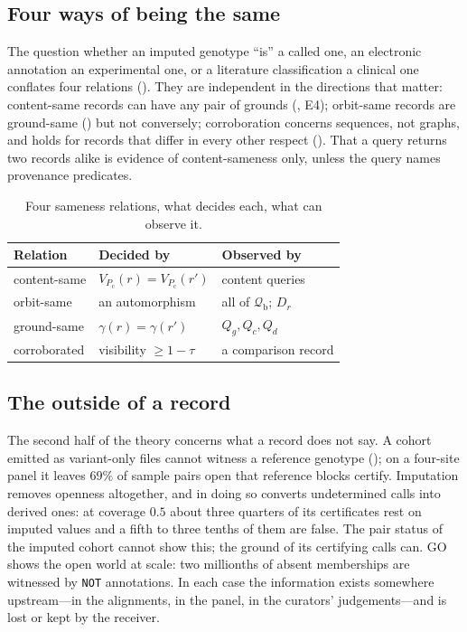 \documentclass[11pt,twocolumn,a4paper]{article}
\theoremstyle{plain}
\theoremstyle{definition}
\theoremstyle{remark}
\newcommand{\Pc}{P_{\mathrm{c}}}
\newcommand{\Desc}{V}
\newcommand{\Qfrag}{\mathcal{Q}_{\mathrm{b}}}
\newcommand{\gr}{\gamma}
\begin{document}
\subsection{Four ways of being the same}

The question whether an imputed genotype ``is'' a called one, an electronic
annotation an experimental one, or a literature classification a clinical one
conflates four relations (). They are independent in the
directions that matter: content-same records can have any pair of grounds
(, E4); orbit-same records are ground-same
() but not conversely; corroboration concerns sequences, not
graphs, and holds for records that differ in every other respect
(). That a query returns two records alike is evidence of
content-sameness only, unless the query names provenance predicates.

\begin{table}[t]
\centering\small
\caption{Four sameness relations, what decides each, what can observe it.}
\label{tab:same}
\begin{tabular}{@{}L{0.22\columnwidth}L{0.33\columnwidth}L{0.35\columnwidth}@{}}
\toprule
Relation & Decided by & Observed by\\
\midrule
content-same & $\Desc_{\Pc}(r)=\Desc_{\Pc}(r')$ & content queries\\
orbit-same & an automorphism & all of $\Qfrag$; $D_r$\\
ground-same & $\gr(r)=\gr(r')$ & $Q_g,Q_c,Q_d$\\
corroborated & visibility $\ge1-\tau$ & a comparison record\\
\bottomrule
\end{tabular}
\end{table}

\subsection{The outside of a record}

The second half of the theory concerns what a record does not say. A cohort
emitted as variant-only files cannot witness a reference genotype
(); on a four-site panel it leaves $69\%$ of sample pairs open
that reference blocks certify. Imputation removes openness altogether, and in
doing so converts undetermined calls into derived ones: at coverage $0.5$ about
three quarters of its certificates rest on imputed values and a fifth to
three tenths of them are false. The pair status of the imputed cohort cannot
show this; the ground of its certifying calls can. GO shows the open world at
scale: two millionths of absent memberships are witnessed by \texttt{NOT}
annotations. In each case the information exists somewhere upstream---in the
alignments, in the panel, in the curators' judgements---and is lost or kept by
the receiver.
\end{document}
